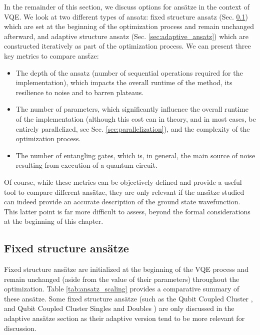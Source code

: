 In the remainder of this section, we discuss options for ans{\"{a}}tze in the context of VQE. We look at two different types of ansatz: fixed structure ansatz (Sec. \ref{sec:fixed_struct}) which are set at the beginning of the optimization process and remain unchanged afterward, and adaptive structure ansatz (Sec. \ref{sec:adaptive_ansatz}) which are constructed iteratively as part of the optimization process. We can present three key metrics to compare ans\"tze: 
\begin{itemize}
    \item The depth of the ansatz (number of sequential operations required for the implementation), which impacts the overall runtime of the method, its resilience to noise and to barren plateaus.
    \item The number of parameters, which significantly influence the overall runtime of the implementation (although this cost can in theory, and in most cases, be entirely parallelized, see Sec. \ref{sec:parallelization}), and the complexity of the optimization process.
    \item The number of entangling gates, which is, in general, the main source of noise resulting from execution of a quantum circuit.
\end{itemize}
Of course, while these metrics can be objectively defined and provide a useful tool to compare different ans\"atze, they are only relevant if the ans\"atze studied can indeed provide an accurate description of the ground state wavefunction. This latter point is far more difficult to assess, beyond the formal considerations at the beginning of this chapter.

\subsection{Fixed structure ans{\"{a}}tze} \label{sec:fixed_struct}

Fixed structure ans{\"{a}}tze are initialized at the beginning of the VQE process and remain unchanged (aside from the value of their parameters) throughout the optimization. Table  \ref{tab:ansatz_scaling} provides a comparative summary of these ans{\"{a}}tze. Some fixed structure ans{\"{a}}tze (such as the Qubit Coupled Cluster \cite{Ryabinkin2018}, and Qubit Coupled Cluster Singles and Doubles \cite{Xia2020}) are only discussed in the adaptive ans{\"{a}}tze section as their adaptive version tend to be more relevant for discussion.

